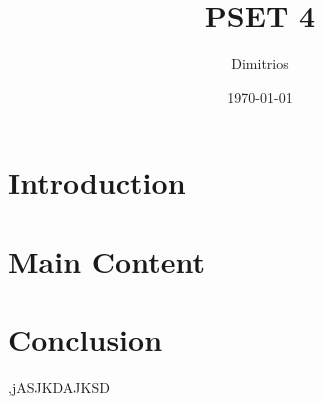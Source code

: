 \documentclass{article}
\title{PSET 4}
\author{Dimitrios}
\date{\today}
\begin{document}
\maketitle
\section{Introduction}

\section{Main Content}

\section{Conclusion}
,jASJKDAJKSD
\end{document}
